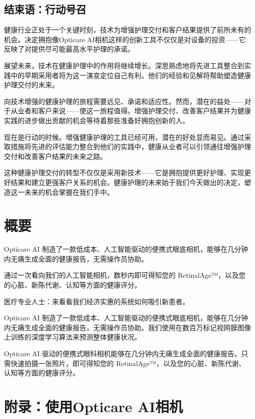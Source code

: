 \documentclass[
  Letterpaper,
]{scrbook}
\begin{document}
\section{结束语：行动号召}\label{ux7ed3ux675fux8bedux884cux52a8ux53f7ux53ec}

健康行业正处于一个关键时刻，技术为增强护理交付和客户结果提供了前所未有的机会。决定拥抱像Opticare
AI相机这样的创新工具不仅仅是对设备的投资------它反映了对提供尽可能最高水平护理的承诺。

展望未来，技术在健康护理中的作用将继续增长。深思熟虑地将先进工具整合到实践中的早期采用者将为这一演变定位自己有利。他们的经验和见解将帮助塑造健康护理交付的未来。

向技术增强的健康护理的旅程需要远见、承诺和适应性。然而，潜在的益处------对于从业者和客户来说------使这一旅程值得。增强护理交付、改善客户结果并为健康实践的进步做出贡献的机会等待着那些准备好拥抱创新的人。

现在是行动的时候。增强健康护理的工具已经可用，潜在的好处显而易见。通过采取措施将先进的评估能力整合到他们的实践中，健康从业者可以引领通往增强护理交付和改善客户结果的未来之路。

这种健康护理交付的转型不仅仅是采用新技术------它是拥抱提供更好护理、实现更好结果和建立更强客户关系的机会。健康护理的未来始于我们今天做出的决定，塑造这一未来的机会掌握在我们手中。


\chapter{概要}\label{ux6982ux8981}

Opticare AI
制造了一款低成本、人工智能驱动的便携式眼底相机，能够在几分钟内无痛生成全面的健康报告，无需操作员协助。

通过一次看向我们的人工智能相机，数秒内即可得知您的
RetinalAge™，以及您的心脏、新陈代谢、认知等方面的健康评分。

医疗专业人士：来看看我们经济实惠的系统如何吸引新患者。

Opticare AI
制造了一款低成本、人工智能驱动的便携式眼底相机，能够在几分钟内无痛生成全面的健康报告，无需操作员协助。我们使用在数百万标记视网膜图像上训练的深度学习算法来预测整体健康状况。

Opticare AI
驱动的便携式眼科相机能够在几分钟内无痛生成全面的健康报告。只需快速拍摄一张照片，即可得知您的
RetinalAge™，以及您的心脏、新陈代谢、认知等方面的健康评分。


\chapter{附录：使用Opticare
AI相机}\label{ux9644ux5f55ux4f7fux7528opticare-aiux76f8ux673a}
\end{document}
